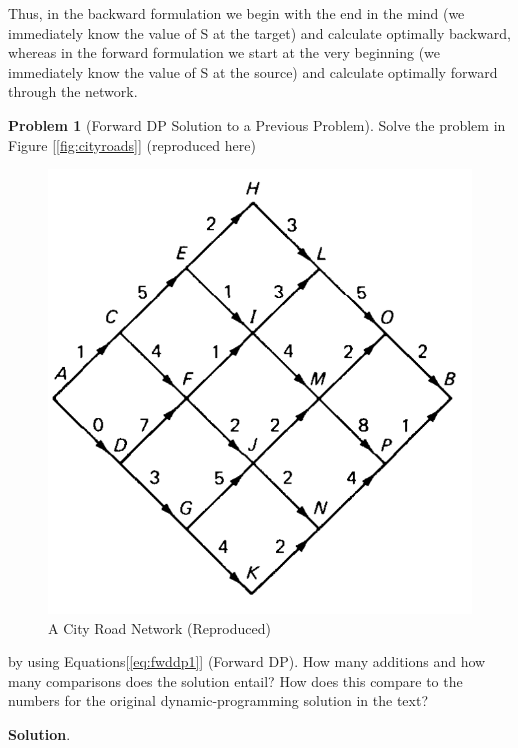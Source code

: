\documentclass[english,notitlepage,smartquotes]{hgbreport}
\theoremstyle{definition}
\theoremstyle{definition}
\newtheorem{problem}{Problem}
\theoremstyle{remark}
\theoremstyle{definition}
\theoremstyle{plain}
\theoremstyle{definition}
\begin{document}
Thus, in the backward formulation we begin with the end in the mind (we immediately know the value of S at the target) and calculate optimally backward, whereas in the forward formulation we start at the very beginning (we immediately know the value of S at the source) and calculate optimally forward through the network.

\begin{problem}[Forward DP Solution to a Previous Problem]
Solve the problem in Figure [\ref{fig:cityroads}] (reproduced here) 

\begin{figure}[H]
\centering
\includegraphics[width=.5\textwidth]{elem-path-problem-1}
\caption{A City Road Network (Reproduced)}
\label{fig:cityroadsrep}
\end{figure}

by using Equations[\ref{eq:fwddp1}] (Forward DP). How many additions and how many comparisons does the solution entail? How does this compare to the numbers for the original dynamic-programming solution in the text?
\end{problem}

\textbf{Solution}.
\end{document}
